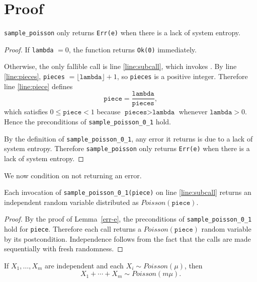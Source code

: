 \documentclass{article}
\begin{document}
\section{Proof}

\begin{lemma}
\label{err-e}
\texttt{sample\_poisson} only returns \texttt{Err(e)} when there is a lack of system entropy.
\end{lemma}

\begin{proof}
If \texttt{lambda} $= 0$, the function returns \texttt{Ok(0)} immediately.

Otherwise, the only fallible call is line \ref{line:subcall}, which invokes
.
By line \ref{line:pieces}, \texttt{pieces} $= \lfloor \texttt{lambda} \rfloor + 1$, so
\texttt{pieces} is a positive integer. Therefore line \ref{line:piece} defines
\[
\texttt{piece} = \frac{\texttt{lambda}}{\texttt{pieces}},
\]
which satisfies $0 \le \texttt{piece} < 1$ because $\texttt{pieces} > \texttt{lambda}$ whenever
$\texttt{lambda} > 0$. Hence the preconditions of \texttt{sample\_poisson\_0\_1} hold.

By the definition of \texttt{sample\_poisson\_0\_1}, any error it returns is due to a lack of
system entropy. Therefore \texttt{sample\_poisson} only returns \texttt{Err(e)} when there is
a lack of system entropy.
\end{proof}

We now condition on not returning an error.

\begin{lemma}
\label{piece-law}
Each invocation of \texttt{sample\_poisson\_0\_1(piece)} on line \ref{line:subcall}
returns an independent random variable distributed as $Poisson(\texttt{piece})$.
\end{lemma}

\begin{proof}
By the proof of Lemma~\ref{err-e}, the preconditions of
\texttt{sample\_poisson\_0\_1} hold for \texttt{piece}. Therefore each call returns a
$Poisson(\texttt{piece})$ random variable by its postcondition. Independence follows from the
fact that the calls are made sequentially with fresh randomness.
\end{proof}

\begin{lemma}
\label{sum-poisson}
If $X_1,\ldots,X_m$ are independent and each $X_i \sim Poisson(\mu)$, then
\[
X_1 + \cdots + X_m \sim Poisson(m\mu).
\]
\end{lemma}
\end{document}
